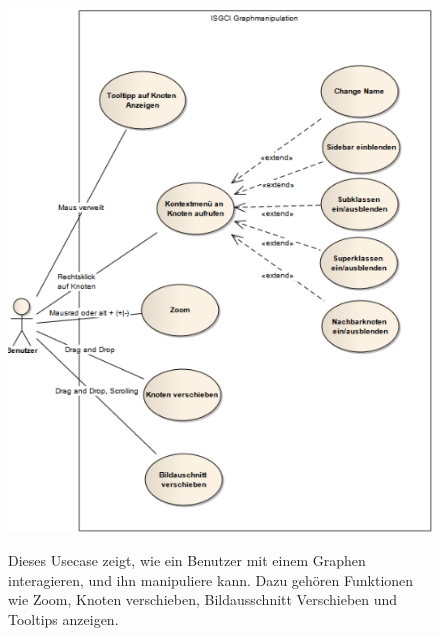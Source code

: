 \documentclass[10pt,a4paper]{article}
\begin{document}
\begin{figure}[htp]
	\begin{center}
		\includegraphics[width=13cm]{Graphmanipulation.PNG}\\
	\end{center}
	\caption{Dieses Usecase zeigt, wie ein Benutzer mit einem Graphen interagieren, und ihn manipuliere kann. Dazu gehören Funktionen wie Zoom, Knoten verschieben, Bildausschnitt Verschieben und Tooltips anzeigen.}
	\label{fig:figure1}
\end{figure}
\end{document}
